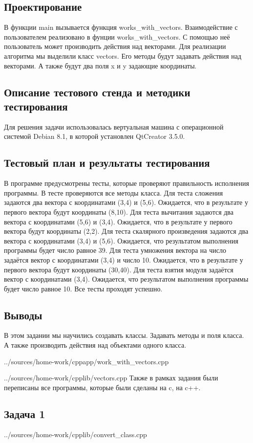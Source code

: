 \documentclass[12pt,a4paper]{report}
\begin{document}
\subsection{Проектирование}
В функции main вызывается функция works\_with\_vectors. Взаимодействие с пользователем реализовано в фунции works\_with\_vectors. С помощью неё пользователь может производить действия над векторами. Для реализации алгоритма мы выделили класс vectors. Его методы будут задавать действия над векторами. А также будут два поля x и y задающие координаты.
\subsection{Описание тестового стенда и методики тестирования}
Для решения задачи использовалась вертуальная машина с операционной системой Debian 8.1, в которой установлен QtCreator 3.5.0. 
\subsection{Тестовый план и результаты тестирования}
В программе предусмотрены тесты, которые проверяют правильность исполнения программы. В тесте проверяются все методы класса. Для теста сложения задаются два вектора с координатами (3,4) и (5,6). Ожидается, что в результате у первого вектора будут координаты (8,10). Для теста вычитания задаются два вектора с координатами (5,6) и (3,4). Ожидается, что в результате у первого вектора будут координаты (2,2). Для теста скалярного произведения задаются два вектора с координатами (3,4) и (5,6). Ожидается, что результатом выполнения программы будет число равное 39. Для теста умножения вектора на число задаётся вектор с координатами (3,4) и число 10. Ожидается, что в результате у первого вектора будут координаты (30,40). Для теста взятия модуля задаётся вектор с координатами (3,4). Ожидается, что результатом выполнения программы будет число равное 10. Все тесты проходят успешно.
\subsection{Выводы}
В этом задании мы научились создавать классы. Задавать методы и поля класса. А также производить действия над объектами одного класса.

{../sources/home-work/cppapp/work_with_vectors.cpp}


{../sources/home-work/cpplib/vectors.cpp}
Также в рамках задания были переписаны все программы, которые были сделаны на c, на c++.
\subsection{Задача 1}

{../sources/home-work/cpplib/convert_class.cpp}
\end{document}
